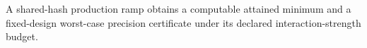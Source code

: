 A shared-hash production ramp obtains a computable attained minimum and a fixed-design worst-case precision certificate under its declared interaction-strength budget.